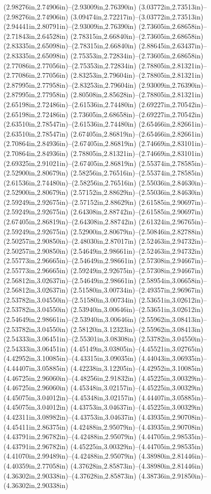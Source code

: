 (2.98276in,2.74906in)--(2.93009in,2.76390in) (3.03772in,2.73513in)--(2.98276in,2.74906in) (3.09474in,2.72217in)--(3.03772in,2.73513in) (2.94441in,2.80791in)--(2.93009in,2.76390in) (2.73605in,2.68658in)--(2.71843in,2.64528in) (2.78315in,2.66840in)--(2.73605in,2.68658in) (2.83335in,2.65098in)--(2.78315in,2.66840in) (2.88645in,2.63437in)--(2.83335in,2.65098in) (2.75353in,2.72834in)--(2.73605in,2.68658in) (2.77086in,2.77056in)--(2.75353in,2.72834in) (2.78805in,2.81321in)--(2.77086in,2.77056in) (2.83253in,2.79604in)--(2.78805in,2.81321in) (2.87995in,2.77958in)--(2.83253in,2.79604in) (2.93009in,2.76390in)--(2.87995in,2.77958in) (2.80508in,2.85628in)--(2.78805in,2.81321in) (2.65198in,2.72486in)--(2.61536in,2.74480in) (2.69227in,2.70542in)--(2.65198in,2.72486in) (2.73605in,2.68658in)--(2.69227in,2.70542in) (2.63510in,2.78547in)--(2.61536in,2.74480in) (2.65466in,2.82661in)--(2.63510in,2.78547in) (2.67405in,2.86819in)--(2.65466in,2.82661in) (2.70864in,2.84936in)--(2.67405in,2.86819in) (2.74669in,2.83101in)--(2.70864in,2.84936in) (2.78805in,2.81321in)--(2.74669in,2.83101in) (2.69325in,2.91021in)--(2.67405in,2.86819in) (2.55374in,2.78585in)--(2.52900in,2.80679in) (2.58256in,2.76516in)--(2.55374in,2.78585in) (2.61536in,2.74480in)--(2.58256in,2.76516in) (2.55036in,2.84630in)--(2.52900in,2.80679in) (2.57152in,2.88629in)--(2.55036in,2.84630in) (2.59249in,2.92675in)--(2.57152in,2.88629in) (2.61585in,2.90697in)--(2.59249in,2.92675in) (2.64308in,2.88742in)--(2.61585in,2.90697in) (2.67405in,2.86819in)--(2.64308in,2.88742in) (2.61324in,2.96765in)--(2.59249in,2.92675in) (2.52900in,2.80679in)--(2.50846in,2.82788in) (2.50257in,2.90850in)--(2.48030in,2.87017in) (2.52463in,2.94732in)--(2.50257in,2.90850in) (2.54649in,2.98661in)--(2.52463in,2.94732in) (2.55773in,2.96665in)--(2.54649in,2.98661in) (2.57308in,2.94667in)--(2.55773in,2.96665in) (2.59249in,2.92675in)--(2.57308in,2.94667in) (2.56812in,3.02637in)--(2.54649in,2.98661in) (2.58954in,3.06658in)--(2.56812in,3.02637in) (2.51580in,3.00734in)--(2.49357in,2.96967in) (2.53782in,3.04550in)--(2.51580in,3.00734in) (2.53651in,3.02612in)--(2.53782in,3.04550in) (2.53940in,3.00646in)--(2.53651in,3.02612in) (2.54649in,2.98661in)--(2.53940in,3.00646in) (2.55962in,3.08413in)--(2.53782in,3.04550in) (2.58120in,3.12323in)--(2.55962in,3.08413in) (2.54333in,3.06451in)--(2.55301in,3.08308in) (2.53782in,3.04550in)--(2.54333in,3.06451in) (4.45149in,3.03805in)--(4.45521in,3.02765in) (4.42952in,3.10085in)--(4.43315in,3.09035in) (4.44043in,3.06935in)--(4.44407in,3.05885in) (4.42238in,3.12205in)--(4.42952in,3.10085in) (4.46725in,2.96060in)--(4.48256in,2.91832in) (4.45225in,3.00329in)--(4.46725in,2.96060in) (4.45348in,3.02157in)--(4.45225in,3.00329in) (4.45075in,3.04012in)--(4.45348in,3.02157in) (4.44407in,3.05885in)--(4.45075in,3.04012in) (4.43753in,3.04637in)--(4.45225in,3.00329in) (4.42311in,3.08982in)--(4.43753in,3.04637in) (4.43935in,2.90708in)--(4.45411in,2.86375in) (4.42488in,2.95079in)--(4.43935in,2.90708in) (4.43791in,2.96782in)--(4.42488in,2.95079in) (4.44705in,2.98535in)--(4.43791in,2.96782in) (4.45225in,3.00329in)--(4.44705in,2.98535in) (4.41070in,2.99489in)--(4.42488in,2.95079in) (4.38980in,2.81446in)--(4.40359in,2.77058in) (4.37628in,2.85873in)--(4.38980in,2.81446in) (4.36302in,2.90338in)--(4.37628in,2.85873in) (4.38736in,2.91850in)--(4.36302in,2.90338in) 